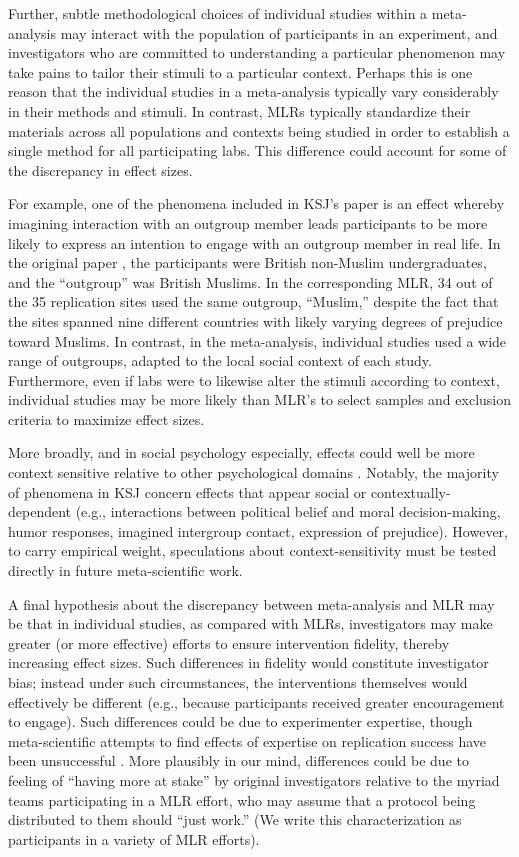 \documentclass[man]{apa7}
\begin{document}
Further, subtle methodological choices of individual studies within a meta-analysis may interact with the population of participants in an experiment, and investigators who are committed to understanding a particular phenomenon may take pains to tailor their stimuli to a particular context. Perhaps this is one reason that the individual studies in a meta-analysis typically vary considerably in their methods and stimuli. In contrast, MLRs typically standardize their materials across all populations and contexts being studied in order to establish a single method for all participating labs. This difference could account for some of the discrepancy in effect sizes. 

For example, one of the phenomena included in KSJ’s paper is an effect whereby imagining interaction with an outgroup member leads participants to be more likely to express an intention to engage with an outgroup member in real life. In the original paper \parencite{husnu2010elaboration}, the participants were British non-Muslim undergraduates, and the “outgroup” was British Muslims. In the corresponding MLR, 34 out of the 35 replication sites used the same outgroup, “Muslim,” despite the fact that the sites spanned nine different countries with likely varying degrees of prejudice toward Muslims. In contrast, in the meta-analysis, individual studies used a wide range of outgroups, adapted to the local social context of each study. Furthermore, even if labs were to likewise alter the stimuli according to context, individual studies may be more likely than MLR's to select samples and exclusion criteria to maximize effect sizes.

More broadly, and in social psychology especially, effects could well be more context sensitive relative to other psychological domains \parencite{van2016contextual,inbar2016association}. Notably, the majority of phenomena in KSJ concern effects that appear social or contextually-dependent (e.g., interactions between political belief and moral decision-making, humor responses, imagined intergroup contact, expression of prejudice). However, to carry empirical weight, speculations about context-sensitivity must be tested directly in future meta-scientific work. 

A final hypothesis about  the discrepancy between meta-analysis and MLR may be that in individual studies, as compared with MLRs, investigators may make greater (or more effective) efforts to ensure intervention fidelity, thereby increasing effect sizes. Such differences in fidelity would constitute investigator bias; instead under such circumstances, the interventions themselves would effectively be different (e.g., because participants received greater encouragement to engage). Such differences could be due to experimenter expertise, though meta-scientific attempts to find effects of expertise on replication success have been unsuccessful \parencite{open2015estimating}. More plausibly in our mind, differences could be due to feeling of “having more at stake” by original investigators relative to the myriad teams participating in a MLR effort, who may assume that a protocol being distributed to them should “just work.” (We write this characterization as participants in a variety of MLR efforts). 
\end{document}
